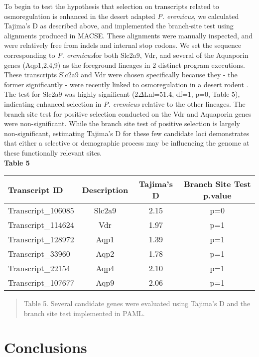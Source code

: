 \documentclass[12pt]{article}
\newcommand{\peer}{\textit{P. eremicus}}
\begin{document}
To begin to test the hypothesis that selection on transcripts related to osmoregulation is enhanced in the desert adapted \peer, we calculated Tajima's D as described above, and implemented the branch-site test using alignments produced in MACSE. These alignments were manually inspected, and were relatively free from indels and internal stop codons. We set the sequence corresponding to \peer\:for both Slc2a9, Vdr, and several of the Aquaporin genes (Aqp1,2,4,9) as the foreground lineages in 2 distinct program executions. These transcripts Slc2a9 and Vdr were chosen specifically because they - the former significantly - were recently linked to osmoregulation in a desert rodent \citep{Marra:2014de}. The test for Slc2a9 was highly significant (2$\Delta$Lnl=51.4, df=1, p=0, Table 5), indicating enhanced selection in \peer\: relative to the other lineages. The branch site test for positive selection conducted on the Vdr and Aquaporin genes were non-significant. While the branch site test of positive selection is largely non-significant, estimating Tajima's D for these few candidate loci demonstrates that either a selective or demographic process may be influencing the genome at these functionally relevant sites.  \\


\textbf{\hypertarget{Table 5}{Table 5}} \\
\begin{center}
\begin{tabular}{ l c c c }
\textbf{Transcript ID} & \textbf{Description} & \textbf{Tajima's D} & \textbf{Branch Site Test p.value} \\
\hline
Transcript\_106085 & Slc2a9 & 2.15 & p=0\\
Transcript\_114624 & Vdr & 1.97 & p=1 \\
Transcript\_128972 & Aqp1 & 1.39 & p=1 \\
Transcript\_33960 & Aqp2 & 1.78 & p=1 \\
Transcript\_22154 & Aqp4 & 2.10 & p=1 \\
Transcript\_107677 & Aqp9 & 2.06 & p=1 \\

 \end{tabular}
\begin{quote}
\small{Table 5. Several candidate genes were evaluated using Tajima's D and the branch site test implemented in PAML. }
\end{quote}  
\end{center}

\section*{Conclusions}
\end{document}
